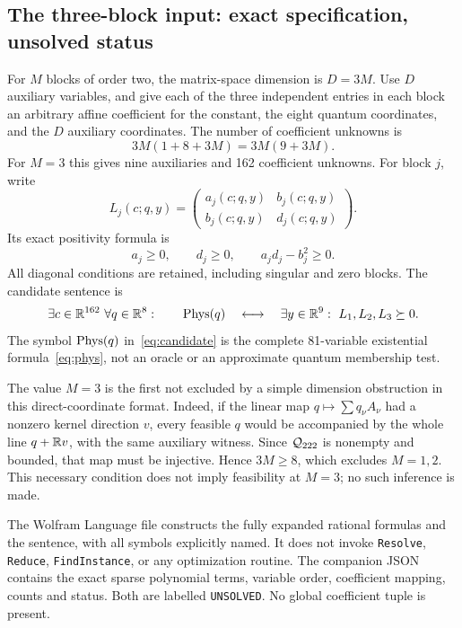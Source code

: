 \subsection{The three-block input: exact specification, unsolved status}
For $M$ blocks of order two, the matrix-space dimension is $D=3M$. Use $D$ auxiliary variables, and give each of the three independent entries in each block an arbitrary affine coefficient for the constant, the eight quantum coordinates, and the $D$ auxiliary coordinates. The number of coefficient unknowns is
\[
 3M(1+8+3M)=3M(9+3M).
\]
For $M=3$ this gives nine auxiliaries and 162 coefficient unknowns. For block $j$, write
\[
 L_j(c;q,y)=\begin{pmatrix}a_j(c;q,y)&b_j(c;q,y)\\
                          b_j(c;q,y)&d_j(c;q,y)\end{pmatrix}.
\]
Its exact positivity formula is
\[
 a_j\ge0,\qquad d_j\ge0,\qquad a_jd_j-b_j^2\ge0.
\]
All diagonal conditions are retained, including singular and zero blocks. The candidate sentence is
\begin{equation}\label{eq:candidate}
 \begin{aligned}
 \exists c\in\mathbb R^{162}\ \forall q\in\mathbb R^8:\qquad
 \operatorname{Phys}(q)\quad\longleftrightarrow\quad
 \exists y\in\mathbb R^9:\
 L_1,L_2,L_3\succeq0.
 \end{aligned}
\end{equation}
The symbol $\operatorname{Phys}(q)$ in~\eqref{eq:candidate} is the complete 81-variable existential formula~\eqref{eq:phys}, not an oracle or an approximate quantum membership test.

The value $M=3$ is the first not excluded by a simple dimension obstruction in this direct-coordinate format. Indeed, if the linear map $q\mapsto\sum q_\nu A_\nu$ had a nonzero kernel direction $v$, every feasible $q$ would be accompanied by the whole line $q+\mathbb R v$, with the same auxiliary witness. Since ${\mathcal Q_{222}}$ is nonempty and bounded, that map must be injective. Hence $3M\ge8$, which excludes $M=1,2$. This necessary condition does not imply feasibility at $M=3$; no such inference is made.

The Wolfram Language file constructs the fully expanded rational formulas and the sentence, with all symbols explicitly named. It does not invoke \texttt{Resolve}, \texttt{Reduce}, \texttt{FindInstance}, or any optimization routine. The companion JSON contains the exact sparse polynomial terms, variable order, coefficient mapping, counts and status. Both are labelled \texttt{UNSOLVED}. No global coefficient tuple is present.

